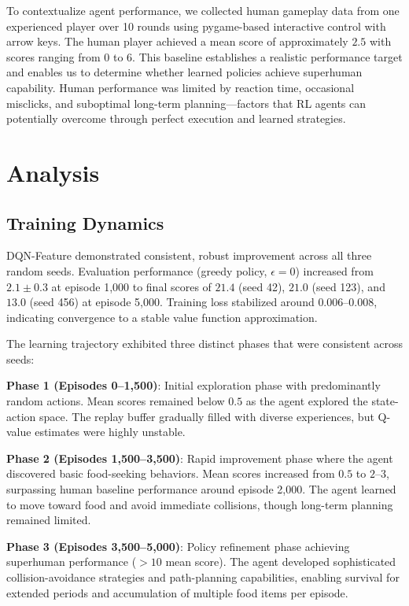 \documentclass[10pt,a4paper,twocolumn]{article}
\begin{document}
To contextualize agent performance, we collected human gameplay data from one experienced player over 10 rounds using pygame-based interactive control with arrow keys. The human player achieved a mean score of approximately $2.5$ with scores ranging from 0 to 6. This baseline establishes a realistic performance target and enables us to determine whether learned policies achieve superhuman capability. Human performance was limited by reaction time, occasional misclicks, and suboptimal long-term planning---factors that RL agents can potentially overcome through perfect execution and learned strategies.

\section{Analysis}

\subsection{Training Dynamics}

DQN-Feature demonstrated consistent, robust improvement across all three random seeds. Evaluation performance (greedy policy, $\epsilon = 0$) increased from $2.1 \pm 0.3$ at episode 1,000 to final scores of $21.4$ (seed 42), $21.0$ (seed 123), and $13.0$ (seed 456) at episode 5,000. Training loss stabilized around $0.006$--$0.008$, indicating convergence to a stable value function approximation.

The learning trajectory exhibited three distinct phases that were consistent across seeds:

\textbf{Phase 1 (Episodes 0--1,500)}: Initial exploration phase with predominantly random actions. Mean scores remained below $0.5$ as the agent explored the state-action space. The replay buffer gradually filled with diverse experiences, but Q-value estimates were highly unstable.

\textbf{Phase 2 (Episodes 1,500--3,500)}: Rapid improvement phase where the agent discovered basic food-seeking behaviors. Mean scores increased from $0.5$ to $2$--$3$, surpassing human baseline performance around episode 2,000. The agent learned to move toward food and avoid immediate collisions, though long-term planning remained limited.

\textbf{Phase 3 (Episodes 3,500--5,000)}: Policy refinement phase achieving superhuman performance ($> 10$ mean score). The agent developed sophisticated collision-avoidance strategies and path-planning capabilities, enabling survival for extended periods and accumulation of multiple food items per episode.
\end{document}
